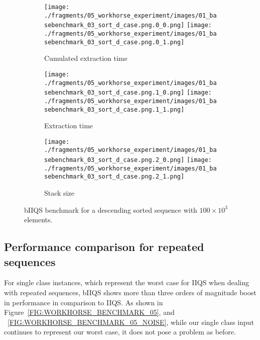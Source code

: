\begin{figure}

    \centering
    \begin{subfigure}[b]{\textwidth}
        \centering
        \texttt{[image: ./fragments/05\_workhorse\_experiment/images/01\_basebenchmark\_03\_sort\_d\_case.png.0\_0.png]}
        \texttt{[image: ./fragments/05\_workhorse\_experiment/images/01\_basebenchmark\_03\_sort\_d\_case.png.0\_1.png]}
        \caption{Cumulated extraction time}
        \label{FIG:WORKHORSE_BENCHMARK_03__0_0}
    \end{subfigure}

    \begin{subfigure}[b]{\textwidth}
        \centering
        \texttt{[image: ./fragments/05\_workhorse\_experiment/images/01\_basebenchmark\_03\_sort\_d\_case.png.1\_0.png]}
        \texttt{[image: ./fragments/05\_workhorse\_experiment/images/01\_basebenchmark\_03\_sort\_d\_case.png.1\_1.png]}
        \caption{Extraction time}
        \label{FIG:WORKHORSE_BENCHMARK_03__0_1}
    \end{subfigure}

    \begin{subfigure}[b]{\textwidth}
        \centering
        \texttt{[image: ./fragments/05\_workhorse\_experiment/images/01\_basebenchmark\_03\_sort\_d\_case.png.2\_0.png]}
        \texttt{[image: ./fragments/05\_workhorse\_experiment/images/01\_basebenchmark\_03\_sort\_d\_case.png.2\_1.png]}
        \caption{Stack size}
        \label{FIG:WORKHORSE_BENCHMARK_03__0_2}
    \end{subfigure}
    
    \caption{bIIQS benchmark for a descending sorted sequence with $100\times10^3$ elements.}
       \label{FIG:WORKHORSE_BENCHMARK_03}
\end{figure}


\subsection{Performance comparison for repeated sequences}

For single class instances, which represent the worst case for IIQS when dealing with repeated sequences, bIIQS shows more than three orders of magnitude boost in performance in comparison to IIQS. As shown in Figure~\ref{FIG:WORKHORSE_BENCHMARK_05}, and ~\ref{FIG:WORKHORSE_BENCHMARK_05_NOISE}, while our single class input continues to represent our worst case, it does not pose a problem as before. \\

